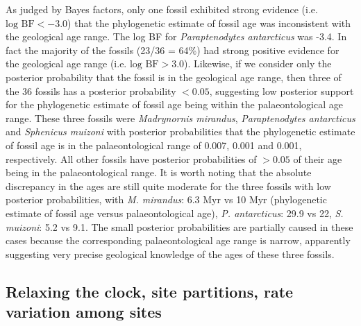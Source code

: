 \documentclass[11pt]{article}
\begin{document}
As judged by Bayes factors, only one fossil exhibited strong evidence (i.e. $\text{log BF} < -3.0$) that the phylogenetic estimate of fossil age was inconsistent with the geological age range. The log BF for {\em Paraptenodytes antarcticus} was -3.4. In fact the majority of the fossils (23/36 = 64\%) had strong positive evidence for the geological age range (i.e. $\text{log BF} > 3.0$).
Likewise, if we consider only the posterior probability that the fossil is in the geological age range, then three of the 36 fossils has a posterior probability $< 0.05$, suggesting low posterior support for the phylogenetic estimate of fossil age being within the palaeontological age range.
These three fossils were {\em Madrynornis mirandus}, {\em Paraptenodytes antarcticus} and {\em Sphenicus muizoni} with posterior probabilities that the phylogenetic estimate of fossil age is in the palaeontological range of 0.007, 0.001 and 0.001, respectively. 
All other fossils have posterior probabilities of $> 0.05$ of their age being in the palaeontological range. 
It is worth noting that the absolute discrepancy in the ages are still quite moderate for the three fossils with low posterior probabilities, with {\em M. mirandus}: 6.3 Myr vs 10 Myr (phylogenetic estimate of fossil age versus palaeontological age), {\em P. antarcticus}: 29.9 vs 22, {\em S. muizoni}: 5.2 vs 9.1. 
The small posterior probabilities are partially caused in these cases because the corresponding palaeontological age range is narrow, apparently suggesting very precise geological knowledge of the ages of these three fossils.

\subsection*{Relaxing the clock, site partitions, rate variation among sites}
\end{document}
